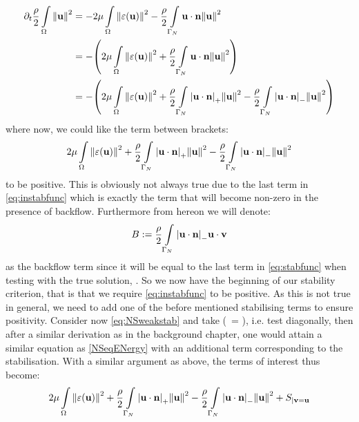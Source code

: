 \[
\begin{aligned}
   \partial_t\frac{\rho}{2}\int\limits_{\Omega}\norm{{\textbf{u}}}^2 &= -2\mu\int\limits_{\Omega}\norm{\varepsilon({\textbf{u}})}^2 - \frac{\rho}{2}\int\limits_{\Gamma_{N}}{\textbf{u}}\cdot{\textbf{n}}\norm{{\textbf{u}}}^2\\
                                              &= -\qty(2\mu\int\limits_{\Omega}\norm{\varepsilon({\textbf{u}})}^2 + \frac{\rho}{2}\int\limits_{\Gamma_{N}}{\textbf{u}}\cdot{\textbf{n}}\norm{{\textbf{u}}}^2)\\
                                              &= -\qty(2\mu\int\limits_{\Omega}\norm{\varepsilon({\textbf{u}})}^2 + \frac{\rho}{2}\int\limits_{\Gamma_{N}}\abs{{\textbf{u}}\cdot{\textbf{n}}}_+\norm{{\textbf{u}}}^2 - \frac{\rho}{2}\int\limits_{\Gamma_{N}}\abs{{\textbf{u}}\cdot{\textbf{n}}}_-\norm{{\textbf{u}}}^2)
\end{aligned}
\]
where now, we could like the term between brackets:
\begin{equation}\label{eq:instabfunc}
    2\mu\int\limits_{\Omega}\norm{\varepsilon({\textbf{u}})}^2 + \frac{\rho}{2}\int\limits_{\Gamma_{N}}\abs{{\textbf{u}}\cdot{\textbf{n}}}_+\norm{{\textbf{u}}}^2 - \frac{\rho}{2}\int\limits_{\Gamma_{N}}\abs{{\textbf{u}}\cdot{\textbf{n}}}_-\norm{{\textbf{u}}}^2
\end{equation}
to be positive. This is obviously not always true due to the last term in \autoref{eq:instabfunc} which is exactly the term that will become non-zero in the presence of backflow. Furthermore from hereon we will denote:
\begin{equation}\label{eq:backflow}
    B := \frac{\rho}{2}\int\limits_{\Gamma_{N}}\abs{{\textbf{u}}\cdot{\textbf{n}}}_- {\textbf{u}} \cdot {\textbf{v}}
\end{equation} as the backflow term since it will be equal to the last term in \autoref{eq:stabfunc} when testing with the true solution, \mathm{\bmu}. So we now have the beginning of our stability criterion, that is that we require \autoref{eq:instabfunc} to be positive. As this is not true in general, we need to add one of the before mentioned stabilising terms to ensure positivity. Consider now \autoref{eq:NSweakstab} and take (\bmv~= \bmu), i.e. test diagonally, then after a similar derivation as in the background chapter, one would attain a similar equation as \autoref{NSeqENergy} with an additional term corresponding to the stabilisation. With a similar argument as above, the terms of interest thus become:
\begin{equation}\label{eq:stabfunc}
    2\mu\int\limits_{\Omega}\norm{\varepsilon({\textbf{u}})}^2 + \frac{\rho}{2}\int\limits_{\Gamma_{N}}\abs{{\textbf{u}}\cdot{\textbf{n}}}_+\norm{{\textbf{u}}}^2 - \frac{\rho}{2}\int\limits_{\Gamma_{N}}\abs{{\textbf{u}}\cdot{\textbf{n}}}_-\norm{{\textbf{u}}}^2 + S_{|{\textbf{v}}={\textbf{u}}}
\end{equation}
